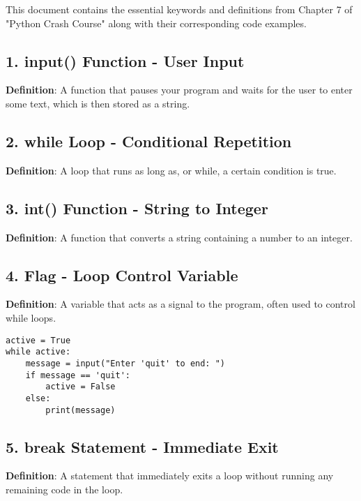 
This document contains the essential keywords and definitions from Chapter 7 of "Python Crash Course" along with their corresponding code examples.

\subsection*{1. input() Function - User Input}
\textbf{Definition}: A function that pauses your program and waits for the user to enter some text, which is then stored as a string.



\subsection*{2. while Loop - Conditional Repetition}
\textbf{Definition}: A loop that runs as long as, or while, a certain condition is true.



\subsection*{3. int() Function - String to Integer}
\textbf{Definition}: A function that converts a string containing a number to an integer.



\subsection*{4. Flag - Loop Control Variable}
\textbf{Definition}: A variable that acts as a signal to the program, often used to control while loops.

\begin{lstlisting}
active = True
while active:
    message = input("Enter 'quit' to end: ")
    if message == 'quit':
        active = False
    else:
        print(message)
\end{lstlisting}

\subsection*{5. break Statement - Immediate Exit}
\textbf{Definition}: A statement that immediately exits a loop without running any remaining code in the loop.

